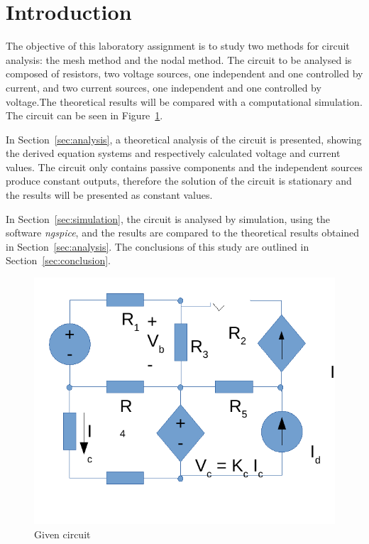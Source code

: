 \section{Introduction}
\label{sec:introduction}

\par The objective of this laboratory assignment is to study two methods for circuit analysis: the mesh method and the nodal method. The circuit to be analysed is composed of resistors, two voltage sources, one independent and one controlled by current, and two current sources, one independent and one controlled by voltage.The theoretical results will be compared with a computational simulation. The circuit can be seen in Figure~\ref{fig:circuit}. 

\par In Section~\ref{sec:analysis}, a theoretical analysis of the circuit is presented, showing the derived equation systems and respectively calculated voltage and current values. The circuit only contains passive components and the independent sources produce constant outputs, therefore the solution of the circuit is stationary and the results will be presented as constant values.
\par In Section~\ref{sec:simulation}, the circuit is analysed by
simulation, using the software \textit{ngspice}, and the results are compared to the theoretical results obtained in
Section~\ref{sec:analysis}. The conclusions of this study are outlined in Section~\ref{sec:conclusion}.

\begin{figure}[H]
\centering
\includegraphics[width=10 cm]{rc.pdf}
\caption{Given circuit}
\label{fig:circuit}
\end{figure}
